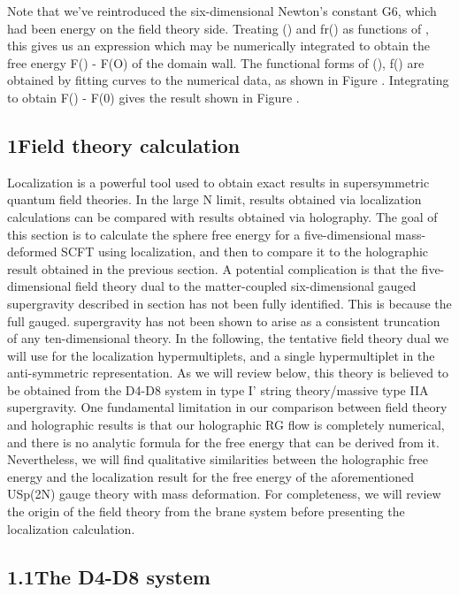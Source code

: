\documentclass{article}
\begin{document}
\sloppy

Note that we've reintroduced the six-dimensional Newton's constant G6, which had been
energy on the field theory side. Treating () and fr() as functions of , this gives us an
expression which may be numerically integrated to obtain the free energy F() - F(O) of
the domain wall. The functional forms of (), f() are obtained by fitting curves to the
numerical data, as shown in Figure . Integrating to obtain F() - F(0) gives the result
shown in Figure .


\subsection*{1Field theory calculation}


Localization is a powerful tool used to obtain exact results in supersymmetric quantum field
theories. In the large N limit, results obtained via localization calculations can be compared
with results obtained via holography. The goal of this section is to calculate the sphere free
energy for a five-dimensional mass-deformed SCFT using localization, and then to compare
it to the holographic result obtained in the previous section. A potential complication
is that the five-dimensional field theory dual to the matter-coupled six-dimensional gauged
supergravity described in section has not been fully identified. This is because the full gauged.
supergravity has not been shown to arise as a consistent truncation of any ten-dimensional
theory. In the following, the tentative field theory dual we will use for the localization
hypermultiplets, and a single hypermultiplet in the anti-symmetric representation. As we
will review below, this theory is believed to be obtained from the D4-D8 system in type I'
string theory/massive type IIA supergravity. One fundamental limitation in our comparison
between field theory and holographic results is that our holographic RG flow is completely
numerical, and there is no analytic formula for the free energy that can be derived from it.
Nevertheless, we will find qualitative similarities between the holographic free energy and
the localization result for the free energy of the aforementioned USp(2N) gauge theory with
mass deformation. For completeness, we will review the origin of the field theory from the
brane system before presenting the localization calculation.


\subsection*{1.1The D4-D8 system}
\end{document}
